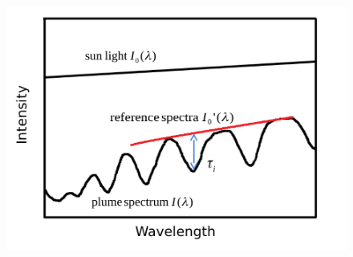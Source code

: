 \documentclass{beamer} %
\begin{document}
\begin{frame}
\begin{multicols}{2}
\begin{figure}
		\centering
		\includegraphics[width=1\linewidth]{../../Bilder/dddd}
		\label{fig:dddd}
	\end{figure}	
	\end{multicols}
	\end{frame}
\end{document}
